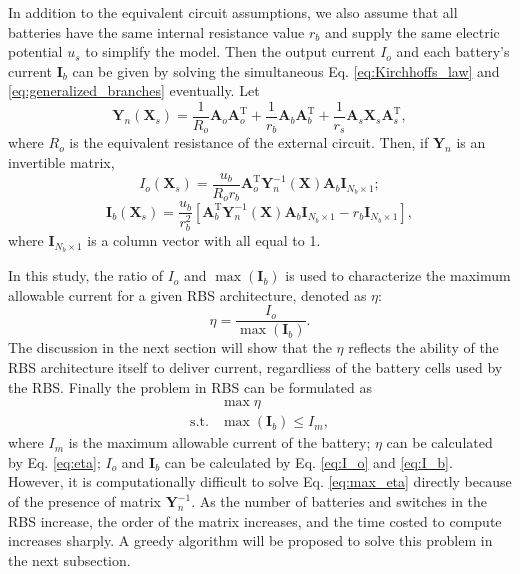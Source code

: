 \documentclass{article}
\def\T{\mathrm{T}}
\begin{document}
In addition to the equivalent circuit assumptions, we also assume that all batteries have the same internal resistance value $r_b$ and supply the same electric potential $u_s$ to simplify the model.
Then the output current $I_o$ and each battery's current $\bm{I}_b$ can be given by solving the simultaneous Eq. \ref{eq:Kirchhoffs_law} and \ref{eq:generalized_branches} eventually.
Let
\begin{equation}\label{eq:Yn}
    \bm{Y}_n (\bm{X}_s) = \frac{1}{R_o} \bm{A}_o\bm{A}_o^\T + \frac{1}{r_b} \bm{A}_b\bm{A}_b^\T + \frac{1}{r_s}\bm{A}_s\bm{X}_s\bm{A}_s^\T,
\end{equation}
where $R_o$ is the equivalent resistance of the external circuit.
Then, if $\bm{Y}_n$ is an invertible matrix,
\begin{equation}
    I_o(\bm{X}_s)       = \frac{u_b}{R_o r_b} \bm{A}_o^\T \bm{Y}_n^{-1}(\bm{X}) \bm{A}_b \bm{I}_{N_b\times 1};\label{eq:I_o}
\end{equation}
\begin{equation}
    \bm{I}_b(\bm{X}_s)  = \frac{u_b}{r_b^2}[\bm{A}_b^\T \bm{Y}_n^{-1}(\bm{X}) \bm{A}_b\bm{I}_{N_b \times 1}  -r_b \bm{I}_{N_b \times 1}],\label{eq:I_b}
\end{equation}
where $\bm{I}_{N_b\times 1}$ is a column vector with all equal to 1.


In this study, the ratio of $I_o$ and $\max (\bm{I}_b)$ is used to characterize the maximum allowable current for a given RBS architecture, denoted as $\eta$:
\begin{equation}\label{eq:eta}
    \eta = \frac{I_o}{\max (\bm{I}_b)}.
\end{equation}
The discussion in the next section will show that the $\eta$ reflects the ability of the RBS architecture itself to deliver current, regardliess of the battery cells used by the RBS.
Finally the problem in RBS can be formulated as
\begin{align}
    & \max \eta \label{eq:max_eta}\\
    \text{s.t.} & \max (\bm{I}_b) \leq I_m, \label{eq:Ib_leq_Im}
\end{align}
where $I_m$ is the maximum allowable current of the battery; $\eta$ can be calculated by Eq. \ref{eq:eta}; $I_o$ and $\bm{I}_b$ can be calculated by Eq. \ref{eq:I_o} and \ref{eq:I_b}.
However, it is computationally difficult to solve Eq. \ref{eq:max_eta} directly because of the presence of matrix $\bm{Y}_n^{-1}$.
As the number of batteries and switches in the RBS increase, the order of the matrix increases, and the time costed to compute increases sharply.
A greedy algorithm will be proposed to solve this problem in the next subsection.
\end{document}
